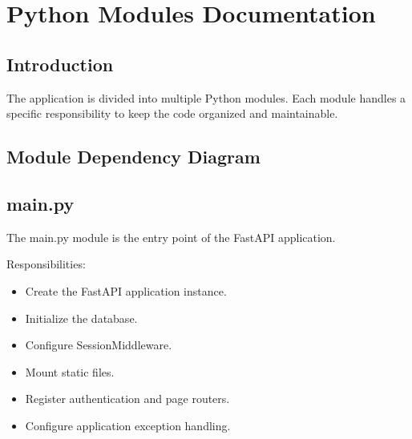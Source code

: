 \documentclass[letterpaper,10pt,english]{sphinxmanual}
\begin{document}
\sphinxstepscope


\section{Python Modules Documentation}
\label{\detokenize{modules:python-modules-documentation}}\label{\detokenize{modules::doc}}

\subsection{Introduction}
\label{\detokenize{modules:introduction}}
\sphinxAtStartPar
The application is divided into multiple Python modules. Each module
handles a specific responsibility to keep the code organized and maintainable.


\subsection{Module Dependency Diagram}
\label{\detokenize{modules:module-dependency-diagram}}

\subsection{main.py}
\label{\detokenize{modules:main-py}}
\sphinxAtStartPar
The main.py module is the entry point of the FastAPI application.

\sphinxAtStartPar
Responsibilities:
\begin{itemize}
\item {} 
\sphinxAtStartPar
Create the FastAPI application instance.

\item {} 
\sphinxAtStartPar
Initialize the database.

\item {} 
\sphinxAtStartPar
Configure SessionMiddleware.

\item {} 
\sphinxAtStartPar
Mount static files.

\item {} 
\sphinxAtStartPar
Register authentication and page routers.

\item {} 
\sphinxAtStartPar
Configure application exception handling.

\end{itemize}

\sphinxAtStartPar
{}
\end{document}
